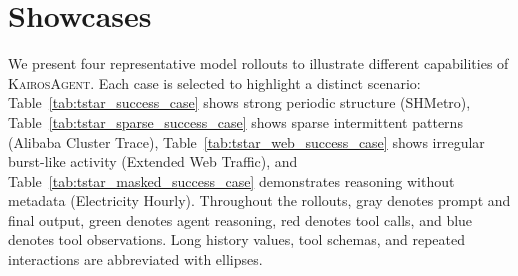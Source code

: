 \documentclass[11pt]{article}
\newcommand{\method}{\textsc{KairosAgent}\xspace}
\begin{document}
\section{Showcases}
\label{app:showcases}

We present four representative model rollouts to illustrate different capabilities of \method.
Each case is selected to highlight a distinct scenario:
Table~\ref{tab:tstar_success_case} shows strong periodic structure (SHMetro),
Table~\ref{tab:tstar_sparse_success_case} shows sparse intermittent patterns (Alibaba Cluster Trace),
Table~\ref{tab:tstar_web_success_case} shows irregular burst-like activity (Extended Web Traffic),
and Table~\ref{tab:tstar_masked_success_case} demonstrates reasoning without metadata (Electricity Hourly).
Throughout the rollouts, \colorbox{gray!10}{gray} denotes prompt and final output, \colorbox{green!10}{green} denotes agent reasoning, \colorbox{red!10}{red} denotes tool calls, and \colorbox{blue!10}{blue} denotes tool observations.
Long history values, tool schemas, and repeated interactions are abbreviated with ellipses.
\end{document}

